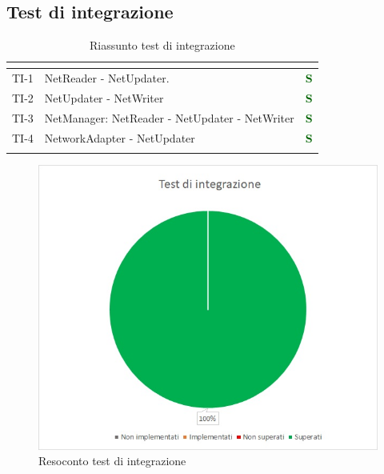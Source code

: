 \subsection{Test di integrazione}
\normalsize
\renewcommand{\arraystretch}{1}
\begin{longtable}{|C{2.5cm}|C{4.5cm}|C{2.5cm}|}
	\hline
	\textbf{\color{title_text}{Test}} & \textbf{\color{title_text}{Componente}} & \textbf{\color{title_text}{Stato}} \\
	\hline
	\endhead
	{TI-1} & NetReader - NetUpdater. & \textcolor{darkgreen}{\textbf{S}}\\
	\hline
	{TI-2} & NetUpdater - NetWriter & \textcolor{darkgreen}{\textbf{S}}\\
	\hline
	{TI-3} & NetManager: NetReader - NetUpdater - NetWriter & \textcolor{darkgreen}{\textbf{S}}\\
	\hline
	{TI-4} & NetworkAdapter - NetUpdater & \textcolor{darkgreen}{\textbf{S}}\\
	\hline
	\caption{Riassunto test di integrazione}
	\label{tabella:riassunto ta}
\end{longtable}
\renewcommand{\arraystretch}{1}
\begin{figure} [H]
	\centering
	\includegraphics[scale=1]{Img/TI}
	\caption{Resoconto test di integrazione}\label{}
\end{figure}
\newpage

